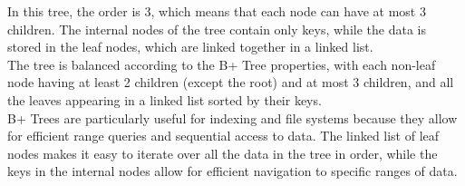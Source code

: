 \documentclass[11pt]{article}
\begin{document}
In this tree, the order is 3, which means that each node can have at most 3 children. The internal nodes of the tree contain only keys, while the data is stored in the leaf nodes, which are linked together in a linked list.\\

The tree is balanced according to the B+ Tree properties, with each non-leaf node having at least 2 children (except the root) and at most 3 children, and all the leaves appearing in a linked list sorted by their keys.\\

B+ Trees are particularly useful for indexing and file systems because they allow for efficient range queries and sequential access to data. The linked list of leaf nodes makes it easy to iterate over all the data in the tree in order, while the keys in the internal nodes allow for efficient navigation to specific ranges of data.
\end{document}

